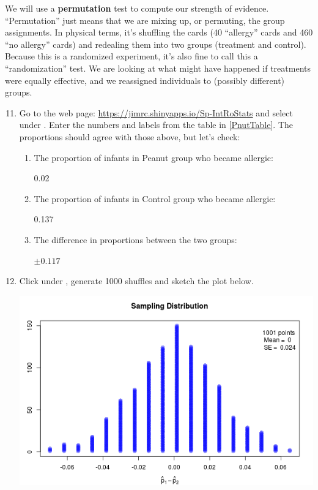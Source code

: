    We will use a {\bf permutation} test to compute our strength of
   evidence. ``Permutation''  just means that we are mixing up, or
   permuting, the group assignments.  In physical terms, it's
   shuffling the cards (40 ``allergy'' cards and 460 ``no allergy''
   cards)  and redealing them into two groups (treatment and control).
   Because  this is a randomized experiment, it's also fine to call this a
   ``randomization'' test.  We are looking at what might have happened
   if treatments were equally effective, and we reassigned individuals
   to (possibly different) groups.
 \begin{enumerate}
  \setcounter{enumi}{10}
   \item Go to the  web page:
   \url{https://jimrc.shinyapps.io/Sp-IntRoStats}
   and select  under  .
   Enter the numbers and labels from the table in \ref{PnutTable}.
   The proportions should agree with those above, but let's check:
   \begin{enumerate}
   \item 
     The proportion of infants in Peanut group who became allergic: \\ 
\begin{key}
 0.02       
\end{key}
   \item The proportion of infants in Control group who became allergic: \\ 
\begin{key}
 0.137       
\end{key}
\item The difference in proportions between the two groups: 
\begin{students}
\vspace{1cm}
\end{students}

\begin{key}
  {\it $ \pm 0.117$ }
\end{key}
\end{enumerate}

   \item  Click  under ,  generate  1000
     shuffles and sketch the plot below. 
\begin{students}
\vspace{4cm}
\end{students}

\begin{key}
  \includegraphics[width=.6\linewidth]{../plots/peanutTest-1000.png}
\end{key}


\end{enumerate}
